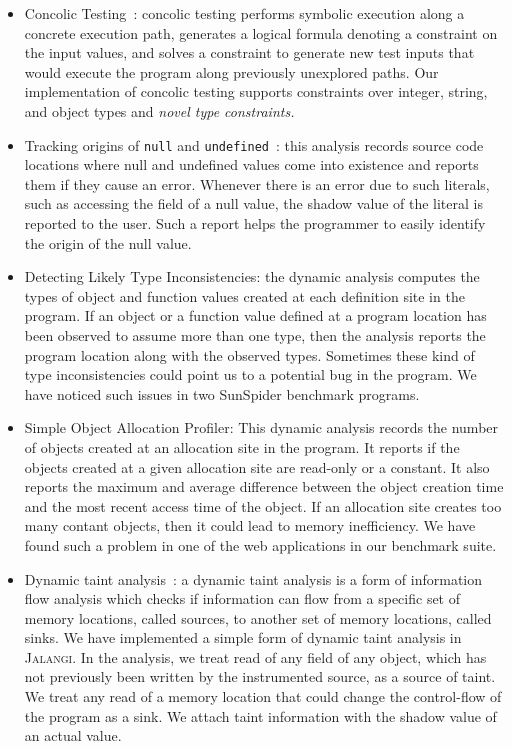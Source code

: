 \documentclass{sig-alternate}
\def\jalangi{\textsc{Jalangi}}
\begin{document}
\begin{itemize}
\item Concolic Testing~\cite{dart,cute}: concolic testing performs
  symbolic execution along a concrete execution path, generates a
  logical formula denoting a constraint on the input values, and
  solves a constraint to generate new test inputs that would execute
  the program along previously unexplored paths.  Our implementation
  of concolic testing supports constraints over integer, string, and
  object types and \emph{novel type constraints.}
\item Tracking origins of \texttt{null} and
  \texttt{undefined}~\cite{Bond:2007:TBA:1297027.1297057}: this
  analysis records source code locations where null and undefined
  values come into existence and reports them if they cause an error.
  Whenever there is an error due to such literals, such as accessing
  the field of a null value, the shadow value of the literal is
  reported to the user.  Such a report helps the programmer to easily
  identify the origin of the null value.
\item Detecting Likely Type Inconsistencies: the dynamic analysis
  computes the types of object and function values created at each
  definition site in the program.  If an object or a function value
  defined at a program location has been observed to assume more than
  one type, then the analysis reports the program location along with
  the observed types.  Sometimes these kind of type inconsistencies
  could point us to a potential bug in the program.  We have noticed
  such issues in two SunSpider benchmark programs.
\item Simple Object Allocation Profiler: This dynamic analysis records
  the number of objects created at an allocation site in the program.
  It reports if the objects created at a given allocation site are
  read-only or a constant.  It also reports the maximum and average
  difference between the object creation time and the most recent
  access time of the object.  If an allocation site creates too many
  contant objects, then it could lead to memory inefficiency.  We have
  found such a problem in one of the web applications in our benchmark
  suite.
\item Dynamic taint
  analysis~\cite{songndss05}: a
  dynamic taint analysis is a form of information flow analysis which
  checks if information can flow from a specific set of memory
  locations, called sources, to another set of memory locations,
  called sinks.  We have implemented a simple form of dynamic taint
  analysis in \jalangi{}.  In the analysis, we treat read of any field
  of any object, which has not previously been written by the
  instrumented source, as a source of taint.  We treat any read of a
  memory location that could change the control-flow of the program as
  a sink.  We attach taint information with the shadow value of an
  actual value.
\end{itemize}
\end{document}
